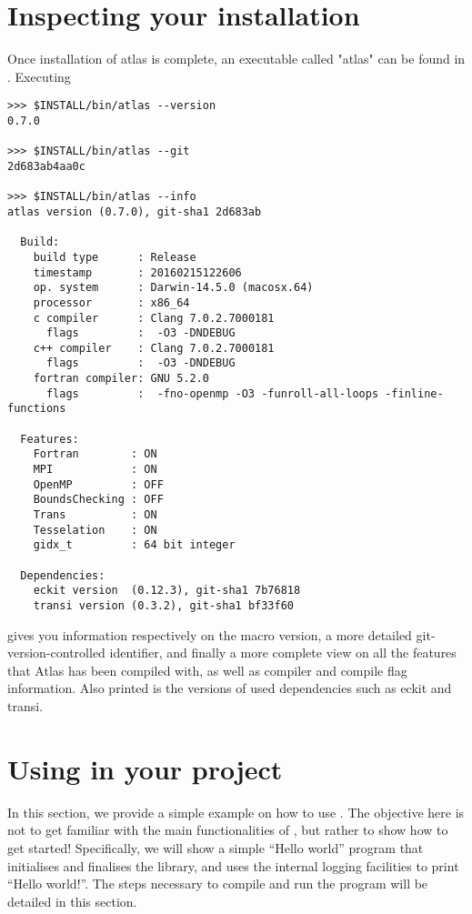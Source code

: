 \section{Inspecting your \Atlas installation} \label{s:inspect}
Once installation of atlas is complete, an executable called "atlas"
can be found in . Executing 
\begin{lstlisting}[style=BashStyle]
>>> $INSTALL/bin/atlas --version
0.7.0

>>> $INSTALL/bin/atlas --git
2d683ab4aa0c

>>> $INSTALL/bin/atlas --info
atlas version (0.7.0), git-sha1 2d683ab

  Build:
    build type      : Release
    timestamp       : 20160215122606
    op. system      : Darwin-14.5.0 (macosx.64)
    processor       : x86_64
    c compiler      : Clang 7.0.2.7000181
      flags         :  -O3 -DNDEBUG
    c++ compiler    : Clang 7.0.2.7000181
      flags         :  -O3 -DNDEBUG
    fortran compiler: GNU 5.2.0
      flags         :  -fno-openmp -O3 -funroll-all-loops -finline-functions

  Features:
    Fortran        : ON
    MPI            : ON
    OpenMP         : OFF
    BoundsChecking : OFF
    Trans          : ON
    Tesselation    : ON
    gidx_t         : 64 bit integer

  Dependencies: 
    eckit version  (0.12.3), git-sha1 7b76818
    transi version (0.3.2), git-sha1 bf33f60
\end{lstlisting}
%
gives you information respectively on the macro version,
a more detailed git-version-controlled identifier, and finally 
a more complete view on all the features that Atlas has been compiled with,
as well as compiler and compile flag information.
Also printed is the versions of used dependencies such as eckit and transi.

\section{Using \Atlas in your project}
\label{s:using}
In this section, we provide a simple example on how to use \Atlas.
The objective here is not to get familiar with the main 
functionalities of \Atlas, but rather to show how to get started!
Specifically, we will show a simple ``Hello world'' program that
initialises and finalises the library, and uses the internal \Atlas
logging facilities to print ``Hello world!''.
The steps necessary to compile and run the program will be detailed
in this section.

